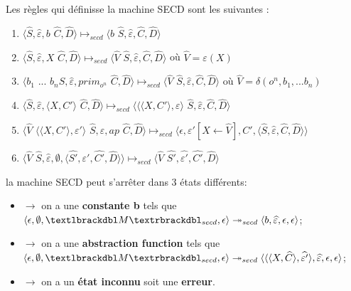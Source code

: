 \documentclass[10pt,a4paper]{article}
\begin{document}
					Les règles qui définisse la machine SECD sont les suivantes :
					
					\begin{enumerate}
						\item $\langle\widehat{S},\widehat{\varepsilon},b$ $\widehat{C},\widehat{D}\rangle \longmapsto_{secd} \langle b$ $\widehat{S},\widehat{\varepsilon},\widehat{C},\widehat{D}\rangle$
						\item $\langle\widehat{S},\widehat{\varepsilon},X$ $\widehat{C},\widehat{D}\rangle \longmapsto_{secd} \langle \widehat{V}$ $\widehat{S},\widehat{\varepsilon},\widehat{C},\widehat{D}\rangle$ où $\widehat{V} = \varepsilon(X)$
						\item $\langle b_{1}$ $...$ $b_{n}\widehat{S},\widehat{\varepsilon},prim_{o^{n}}$ $\widehat{C},\widehat{D}\rangle \longmapsto_{secd} \langle \widehat{V}$ $\widehat{S},\widehat{\varepsilon},\widehat{C},\widehat{D}\rangle$ où $\widehat{V} = \delta(o^{n},b_1,...b_{n})$
						\item $\langle\widehat{S},\widehat{\varepsilon},\langle X,C'\rangle$ $\widehat{C},\widehat{D}\rangle \longmapsto_{secd} \langle\langle\langle X,C'\rangle,\varepsilon\rangle$ $\widehat{S},\widehat{\varepsilon},\widehat{C},\widehat{D}\rangle$
						\item $\langle\widehat{V}$ $\langle\langle X,C'\rangle,\varepsilon'\rangle$ $\widehat{S},\widehat{\varepsilon},ap$ $\widehat{C},\widehat{D}\rangle \longmapsto_{secd} \langle\epsilon,\varepsilon'[X \leftarrow \widehat{V}],C',\langle\widehat{S},\widehat{\varepsilon},\widehat{C},\widehat{D}\rangle\rangle$
						\item $\langle\widehat{V}$ $\widehat{S},\widehat{\varepsilon},\emptyset,\langle\widehat{S'},\widehat{\varepsilon'},\widehat{C'},\widehat{D}\rangle\rangle \longmapsto_{secd} \langle \widehat{V}$ $\widehat{S'},\widehat{\varepsilon'},\widehat{C'},\widehat{D}\rangle$
					\end{enumerate}
					\bigbreak
					
					la machine SECD peut s'arrêter dans 3 états différents:
					\begin{itemize}
						\item[]$\longrightarrow$ on a une \textbf{constante b} tels que $\langle \epsilon,\emptyset,\textlbrackdbl M\textrbrackdbl_{secd},\epsilon\rangle \twoheadrightarrow_{secd} \langle b,\widehat{\varepsilon},\epsilon,\epsilon\rangle$;
						\item[]$\longrightarrow$ on a une \textbf{abstraction function} tels que $\langle \epsilon,\emptyset,\textlbrackdbl M\textrbrackdbl_{secd},\epsilon\rangle \twoheadrightarrow_{secd} \langle\langle\langle X,\widehat{C}\rangle,\widehat{\varepsilon'}\rangle,\widehat{\varepsilon},\epsilon,\epsilon\rangle$;
						\item[]$\longrightarrow$ on a un \textbf{état inconnu} soit une \textbf{erreur}.
					\end{itemize}
					\bigbreak
					
\end{document}
